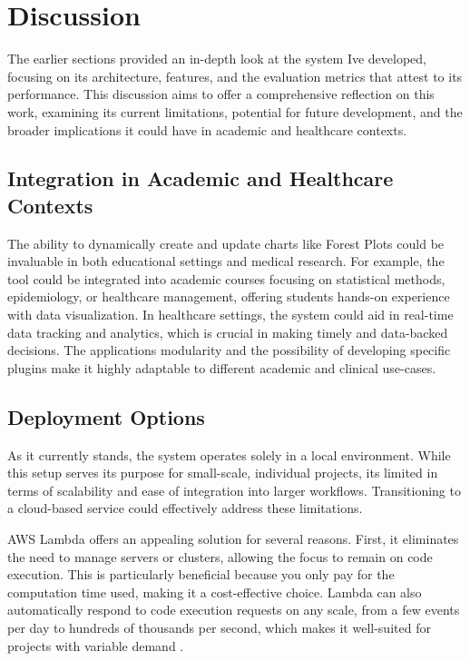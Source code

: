 \section{Discussion}\label{discussion}

The earlier sections provided an in-depth look at the system
I\textquotesingle ve developed, focusing on its architecture, features,
and the evaluation metrics that attest to its performance. This
discussion aims to offer a comprehensive reflection on this work,
examining its current limitations, potential for future development, and
the broader implications it could have in academic and healthcare
contexts.

\subsection{Integration in Academic and Healthcare
Contexts}\label{integration-in-academic-and-healthcare-contexts}

The ability to dynamically create and update
charts like Forest Plots could be invaluable in both educational
settings and medical research. For example, the tool could be integrated
into academic courses focusing on statistical methods, epidemiology, or
healthcare management, offering students hands-on experience with data
visualization. In healthcare settings, the system could aid in real-time
data tracking and analytics, which is crucial in making timely and
data-backed decisions. The application\textquotesingle s modularity and
the possibility of developing specific plugins make it highly adaptable
to different academic and clinical use-cases.

\subsection{Deployment Options}\label{deployment-options}

As it currently stands, the system operates solely in a local
environment. While this setup serves its purpose for small-scale,
individual projects, it\textquotesingle s limited in terms of
scalability and ease of integration into larger workflows. Transitioning
to a cloud-based service could effectively address these limitations.

AWS Lambda offers an appealing solution for several reasons. First, it
eliminates the need to manage servers or clusters, allowing the focus to
remain on code execution. This is particularly beneficial because you
only pay for the computation time used, making it a cost-effective
choice. Lambda can also automatically respond to code execution requests
on any scale, from a few events per day to hundreds of thousands per
second, which makes it well-suited for projects with variable demand
\cite{50}.


